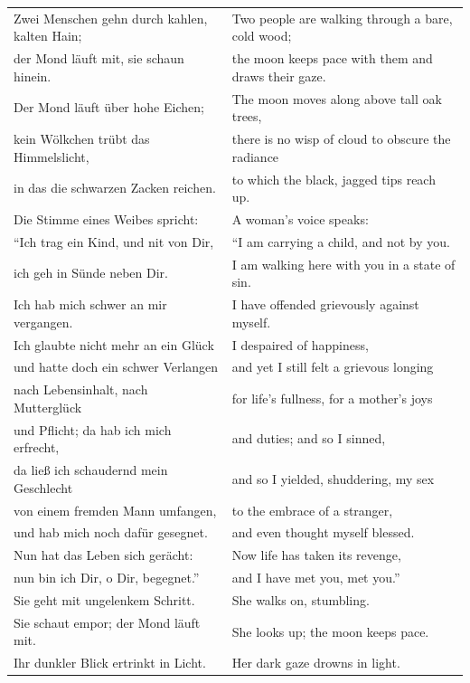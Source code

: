 \begin{table}[h!]
\begin{tabular}{|l|l|} \hline
Zwei Menschen gehn durch kahlen, kalten Hain; & Two people are walking through a bare, cold wood;\\
der Mond l\"auft mit, sie schaun hinein. & the moon keeps pace with them and draws their gaze.\\
Der Mond l\"auft über hohe Eichen; & The moon moves along above tall oak trees,\\
kein W\"olkchen tr\"ubt das Himmelslicht, & there is no wisp of cloud to obscure the radiance\\
in das die schwarzen Zacken reichen. & to which the black, jagged tips reach up.\\
Die Stimme eines Weibes spricht: & A woman’s voice speaks:\\	  	
\hline
``Ich trag ein Kind, und nit von Dir, & ``I am carrying a child, and not by you.\\
ich geh in S\"unde neben Dir. & I am walking here with you in a state of sin.\\
Ich hab mich schwer an mir vergangen. & I have offended grievously against myself.\\
Ich glaubte nicht mehr an ein Gl\"uck & I despaired of happiness,\\
\hline
und hatte doch ein schwer Verlangen & and yet I still felt a grievous longing\\
nach Lebensinhalt, nach Muttergl\"uck & for life’s fullness, for a mother’s joys	\\
\hline
und Pflicht; da hab ich mich erfrecht, & and duties; and so I sinned,\\
da lie{\ss} ich schaudernd mein Geschlecht & and so I yielded, shuddering, my sex\\
von einem fremden Mann umfangen, & to the embrace of a stranger,\\
und hab mich noch daf\"ur gesegnet. & and even thought myself blessed.\\
Nun hat das Leben sich ger\"acht: & Now life  has taken its revenge,\\
nun bin ich Dir, o Dir, begegnet.'' & and I have met you, met you.'' \\	
\hline
Sie geht mit ungelenkem Schritt. & She walks on, stumbling.\\
Sie schaut empor; der Mond l\"auft mit. &  She looks up; the moon keeps pace.\\
Ihr dunkler Blick ertrinkt in Licht. & Her dark gaze drowns in light.\\

\end{tabular}
\end{table}
